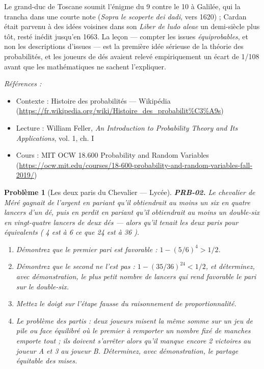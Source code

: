 \documentclass[11pt]{article}
\newtheorem{problem}{Problème}
\newenvironment{refs}{\par\small\noindent\emph{Références :}\begin{itemize}\setlength\itemsep{0pt}}{\end{itemize}\normalsize}
\begin{document}
\noindent Le grand-duc de Toscane soumit l'énigme du 9 contre le 10 à Galilée, qui la
trancha dans une courte note (\textit{Sopra le scoperte dei dadi}, vers 1620) ; Cardan était
parvenu à des idées voisines dans son \textit{Liber de ludo aleae} un demi-siècle plus tôt, resté
inédit jusqu'en 1663. La leçon --- compter les issues \textit{équiprobables}, et non les descriptions
d'issues --- est la première idée sérieuse de la théorie des probabilités, et les joueurs de dés
avaient relevé empiriquement un écart de 1/108 avant que les mathématiques ne sachent
l'expliquer.

\begin{refs}
\item Contexte : Histoire des probabilités --- Wikipédia (\url{https://fr.wikipedia.org/wiki/Histoire_des_probabilit%C3%A9s})
\item Lecture : William Feller, \textit{An Introduction to Probability Theory and Its Applications}, vol. 1, ch. I
\item Cours : MIT OCW 18.600 Probability and Random Variables (\url{https://ocw.mit.edu/courses/18-600-probability-and-random-variables-fall-2019/})
\end{refs}

\bigskip

\begin{problem}[{Les deux paris du Chevalier --- Lycée}]
\textbf{PRB-02.} Le chevalier de Méré gagnait de l'argent en pariant qu'il
obtiendrait au moins un six en quatre lancers d'un dé, puis en perdit en pariant qu'il obtiendrait
au moins un double-six en vingt-quatre lancers de deux dés --- alors qu'il tenait les deux paris
pour équivalents (\og{} 4 est à 6 ce que 24 est à 36 \fg{}).
\begin{enumerate}
\item[(i)] Démontrez que le premier pari est favorable :
$ 1 - (5/6)^4 > 1/2 $.
\item[(ii)] Démontrez que le second ne l'est pas :
$ 1 - (35/36)^{24} < 1/2 $, et déterminez, avec démonstration, le plus petit nombre de lancers
qui rend favorable le pari sur le double-six.
\item[(iii)] Mettez le doigt sur l'étape fausse du
raisonnement de proportionnalité.
\item[(iv)] Le problème des partis : deux joueurs misent la même somme sur un jeu de pile ou face
équilibré où le premier à remporter un nombre fixé de manches emporte tout ; ils doivent
s'arrêter alors qu'il manque encore 2 victoires au joueur A et 3 au joueur B. Déterminez, avec
démonstration, le partage équitable des mises.
\end{enumerate}

\end{problem}
\end{document}
